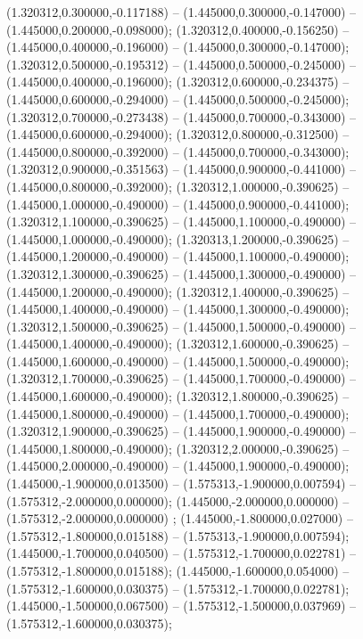  (1.320312,0.300000,-0.117188) -- (1.445000,0.300000,-0.147000) -- (1.445000,0.200000,-0.098000);
 (1.320312,0.400000,-0.156250) -- (1.445000,0.400000,-0.196000) -- (1.445000,0.300000,-0.147000);
 (1.320312,0.500000,-0.195312) -- (1.445000,0.500000,-0.245000) -- (1.445000,0.400000,-0.196000);
 (1.320312,0.600000,-0.234375) -- (1.445000,0.600000,-0.294000) -- (1.445000,0.500000,-0.245000);
 (1.320312,0.700000,-0.273438) -- (1.445000,0.700000,-0.343000) -- (1.445000,0.600000,-0.294000);
 (1.320312,0.800000,-0.312500) -- (1.445000,0.800000,-0.392000) -- (1.445000,0.700000,-0.343000);
 (1.320312,0.900000,-0.351563) -- (1.445000,0.900000,-0.441000) -- (1.445000,0.800000,-0.392000);
 (1.320312,1.000000,-0.390625) -- (1.445000,1.000000,-0.490000) -- (1.445000,0.900000,-0.441000);
 (1.320312,1.100000,-0.390625) -- (1.445000,1.100000,-0.490000) -- (1.445000,1.000000,-0.490000);
 (1.320313,1.200000,-0.390625) -- (1.445000,1.200000,-0.490000) -- (1.445000,1.100000,-0.490000);
 (1.320312,1.300000,-0.390625) -- (1.445000,1.300000,-0.490000) -- (1.445000,1.200000,-0.490000);
 (1.320312,1.400000,-0.390625) -- (1.445000,1.400000,-0.490000) -- (1.445000,1.300000,-0.490000);
 (1.320312,1.500000,-0.390625) -- (1.445000,1.500000,-0.490000) -- (1.445000,1.400000,-0.490000);
 (1.320312,1.600000,-0.390625) -- (1.445000,1.600000,-0.490000) -- (1.445000,1.500000,-0.490000);
 (1.320312,1.700000,-0.390625) -- (1.445000,1.700000,-0.490000) -- (1.445000,1.600000,-0.490000);
 (1.320312,1.800000,-0.390625) -- (1.445000,1.800000,-0.490000) -- (1.445000,1.700000,-0.490000);
 (1.320312,1.900000,-0.390625) -- (1.445000,1.900000,-0.490000) -- (1.445000,1.800000,-0.490000);
 (1.320312,2.000000,-0.390625) -- (1.445000,2.000000,-0.490000) -- (1.445000,1.900000,-0.490000);
 (1.445000,-1.900000,0.013500) -- (1.575313,-1.900000,0.007594) -- (1.575312,-2.000000,0.000000);
 (1.445000,-2.000000,0.000000) -- (1.575312,-2.000000,0.000000) ;
 (1.445000,-1.800000,0.027000) -- (1.575312,-1.800000,0.015188) -- (1.575313,-1.900000,0.007594);
 (1.445000,-1.700000,0.040500) -- (1.575312,-1.700000,0.022781) -- (1.575312,-1.800000,0.015188);
 (1.445000,-1.600000,0.054000) -- (1.575312,-1.600000,0.030375) -- (1.575312,-1.700000,0.022781);
 (1.445000,-1.500000,0.067500) -- (1.575312,-1.500000,0.037969) -- (1.575312,-1.600000,0.030375);
